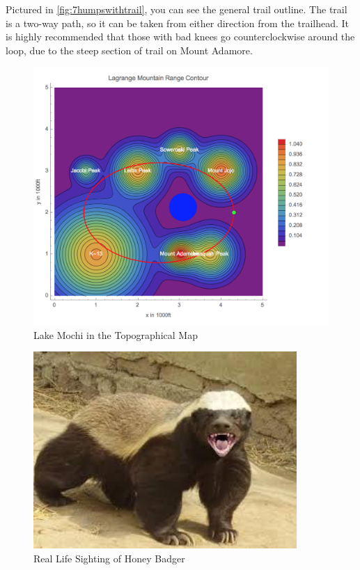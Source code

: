 \documentclass[12pt]{article}   %
\theoremstyle{definition}
\numberwithin{equation}{section}
\begin{document}
\quad Pictured in \autoref{fig:7humpswithtrail}, you can see the general trail outline. The trail is a two-way path, so it can be taken from either direction from the trailhead. It is highly recommended that those with bad knees go counterclockwise around the loop, due to the steep section of trail on Mount Adamore.

\begin{figure} [h]
  \centering
  \includegraphics[width=12cm]{../images/topoLake.png}
  \caption{Lake Mochi in the Topographical Map}
  \label{fig:lakeMochiTopo}
\end{figure}
\begin{figure} [h]
  \centering
  \includegraphics[width=10cm]{../images/honey_badger.jpeg}
  \caption{Real Life Sighting of Honey Badger}
  \label{fig:honeyB}
\end{figure}
\end{document}
